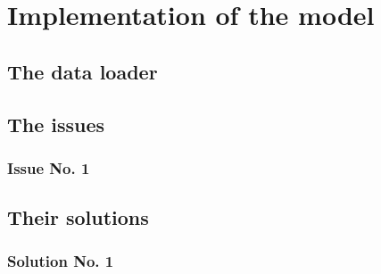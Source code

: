 
\chapter{Implementation of the model}\label{chapter:implementation_of_the_model}

\section{The data loader}
\section{The issues}
\subsection{Issue No. 1}
\section{Their solutions}
\subsection{Solution No. 1}